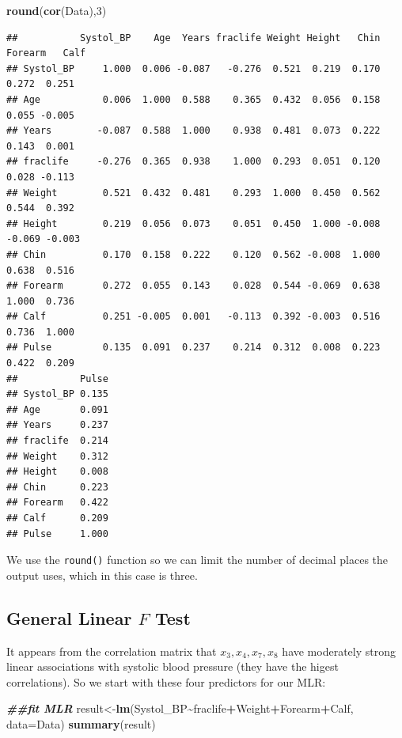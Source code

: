\documentclass[
]{book}
\newenvironment{Shaded}{\begin{snugshade}}{\end{snugshade}}
\newcommand{\AttributeTok}[1]{\textcolor[rgb]{0.13,0.29,0.53}{#1}}
\newcommand{\DecValTok}[1]{\textcolor[rgb]{0.00,0.00,0.81}{#1}}
\newcommand{\DocumentationTok}[1]{\textcolor[rgb]{0.56,0.35,0.01}{\textbf{\textit{#1}}}}
\newcommand{\FunctionTok}[1]{\textcolor[rgb]{0.13,0.29,0.53}{\textbf{#1}}}
\newcommand{\NormalTok}[1]{#1}
\newcommand{\OtherTok}[1]{\textcolor[rgb]{0.56,0.35,0.01}{#1}}
\newcommand{\SpecialCharTok}[1]{\textcolor[rgb]{0.81,0.36,0.00}{\textbf{#1}}}
\begin{document}
\begin{Shaded}
\begin{Highlighting}[]
\FunctionTok{round}\NormalTok{(}\FunctionTok{cor}\NormalTok{(Data),}\DecValTok{3}\NormalTok{)}
\end{Highlighting}
\end{Shaded}

\begin{verbatim}
##           Systol_BP    Age  Years fraclife Weight Height   Chin Forearm   Calf
## Systol_BP     1.000  0.006 -0.087   -0.276  0.521  0.219  0.170   0.272  0.251
## Age           0.006  1.000  0.588    0.365  0.432  0.056  0.158   0.055 -0.005
## Years        -0.087  0.588  1.000    0.938  0.481  0.073  0.222   0.143  0.001
## fraclife     -0.276  0.365  0.938    1.000  0.293  0.051  0.120   0.028 -0.113
## Weight        0.521  0.432  0.481    0.293  1.000  0.450  0.562   0.544  0.392
## Height        0.219  0.056  0.073    0.051  0.450  1.000 -0.008  -0.069 -0.003
## Chin          0.170  0.158  0.222    0.120  0.562 -0.008  1.000   0.638  0.516
## Forearm       0.272  0.055  0.143    0.028  0.544 -0.069  0.638   1.000  0.736
## Calf          0.251 -0.005  0.001   -0.113  0.392 -0.003  0.516   0.736  1.000
## Pulse         0.135  0.091  0.237    0.214  0.312  0.008  0.223   0.422  0.209
##           Pulse
## Systol_BP 0.135
## Age       0.091
## Years     0.237
## fraclife  0.214
## Weight    0.312
## Height    0.008
## Chin      0.223
## Forearm   0.422
## Calf      0.209
## Pulse     1.000
\end{verbatim}

We use the \texttt{round()} function so we can limit the number of decimal places the output uses, which in this case is three.

\hypertarget{general-linear-f-test}{%
\subsection*{\texorpdfstring{General Linear \(F\) Test}{General Linear F Test}}\label{general-linear-f-test}}

It appears from the correlation matrix that \(x_3, x_4, x_7, x_8\) have moderately strong linear associations with systolic blood pressure (they have the higest correlations). So we start with these four predictors for our MLR:

\begin{Shaded}
\begin{Highlighting}[]
\DocumentationTok{\#\#fit MLR}
\NormalTok{result}\OtherTok{\textless{}{-}}\FunctionTok{lm}\NormalTok{(Systol\_BP}\SpecialCharTok{\textasciitilde{}}\NormalTok{fraclife}\SpecialCharTok{+}\NormalTok{Weight}\SpecialCharTok{+}\NormalTok{Forearm}\SpecialCharTok{+}\NormalTok{Calf, }\AttributeTok{data=}\NormalTok{Data)}
\FunctionTok{summary}\NormalTok{(result)}
\end{Highlighting}
\end{Shaded}
\end{document}
